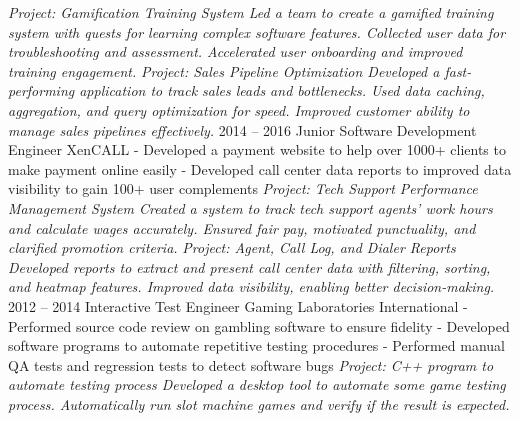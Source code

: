 \documentclass[9pt]{developercv} %
\begin{document}
\begin{entrylist}
{            \textit{Project: Gamification Training System\newline
            Led a team to create a gamified training system with quests for learning complex software features. 
            Collected user data for troubleshooting and assessment. 
            Accelerated user onboarding and improved training engagement. \newline\newline}
            \textit{Project: Sales Pipeline Optimization\newline
            Developed a fast-performing application to track sales leads and bottlenecks. 
            Used data caching, aggregation, and query optimization for speed. 
            Improved customer ability to manage sales pipelines effectively.\newline}
        }
	\entry
		{2014 -- 2016}
		{Junior Software Development Engineer}
		{XenCALL}
		{
            - Developed a payment website to help over 1000+ clients to make payment online easily\newline
            - Developed call center data reports to improved data visibility to gain 100+ user complements\newline
            \newline
            \textit{Project: Tech Support Performance Management System\newline
            Created a system to track tech support agents' work hours and calculate wages accurately. 
            Ensured fair pay, motivated punctuality, and clarified promotion criteria.
            \newline\newline}
            \textit{Project: Agent, Call Log, and Dialer Reports\newline
            Developed reports to extract and present call center data with filtering, sorting, and heatmap features. 
            Improved data visibility, enabling better decision-making.\newline}
        }
    \entry
		{2012 -- 2014}
		{Interactive Test Engineer}
		{Gaming Laboratories International}
		{
            - Performed source code review on gambling software to ensure fidelity\newline
            - Developed software programs to automate repetitive testing procedures\newline
            - Performed manual QA tests and regression tests to detect software bugs\newline\newline
            \textit{Project: C++ program to automate testing process\newline
            Developed a desktop tool to automate some game testing process. 
            Automatically run slot machine games and verify if the result is expected.\newline}
        }
\end{entrylist}
\end{document}
